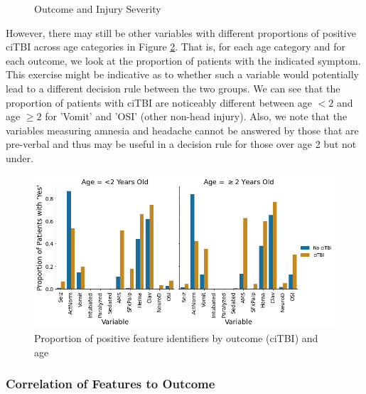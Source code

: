 \documentclass[11pt, letterpaper]{amsart}
\let\Oldsubsubsection\subsubsection
\renewcommand{\subsubsection}{\FloatBarrier\Oldsubsubsection}
\begin{document}
\begin{figure}
\begin{minipage}[b]{0.5\linewidth}
		\label{fig:age_by_injury_severity}
	\end{minipage}
	\caption{Outcome and Injury Severity}\label{fig:age_distributions}
\end{figure}

However, there may still be other variables with different proportions of positive ciTBI across age categories in Figure \ref{fig:age_covariate}. That is, for each age category and for each outcome, we look at the proportion of patients with the indicated symptom. This exercise might be indicative as to whether such a variable would potentially lead to a different decision rule between the two groups. We can see that the proportion of patients with ciTBI are noticeably different between age $<2$ and age $\geq 2$ for 'Vomit' and 'OSI' (other non-head injury). Also, we note that the variables measuring amnesia and headache cannot be answered by those that are pre-verbal and thus may be useful in a decision rule for those over age 2 but not under.
\begin{figure}
	\centering
	\includegraphics[width=\textwidth]{covariate_by_age.png}
	\caption{Proportion of positive feature identifiers by outcome (ciTBI) and age}\label{fig:age_covariate}
\end{figure}

\subsubsection{Correlation of Features to Outcome}
\end{document}
